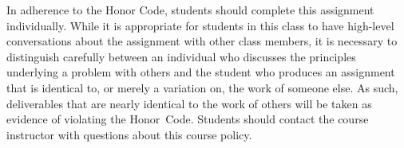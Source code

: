 \noindent In adherence to the Honor Code, students should complete this assignment individually. While it is appropriate
for students in this class to have high-level conversations about the assignment with other class members, it is
necessary to distinguish carefully between an individual who discusses the principles underlying a problem with others
and the student who produces an assignment that is identical to, or merely a variation on, the work of someone else.  As
such, deliverables that are nearly identical to the work of others will be taken as evidence of violating the
\mbox{Honor Code}.  Students should contact the course instructor with questions about this course policy.

  
